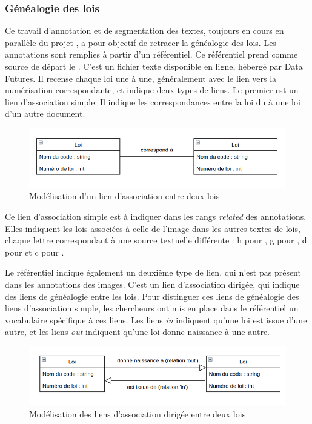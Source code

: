 \newpage
\subsubsection{Généalogie des lois}
Ce travail d'annotation et de segmentation des textes, toujours en cours en parallèle du projet \COREL, a pour objectif de retracer la généalogie des lois. Les annotations sont remplies à partir d'un référentiel. Ce référentiel prend comme source de départ le \genyuan. C'est un fichier texte disponible en ligne, hébergé par Data Futures. Il recense chaque loi une à une, généralement avec le lien vers la numérisation correspondante, et indique deux types de liens. Le premier est un lien d'association simple. Il indique les correspondances entre la loi du \genyuan à une loi d'un autre document. 
\begin{figure}[h]
    \centering
    \includegraphics[width=\textwidth]{images/image4.png}
    \caption{Modélisation d'un lien d'association entre deux lois}
    \label{Modélisation d'un lien d'association entre les lois}
\end{figure}

Ce lien d'association simple est à indiquer dans les rangs \textit{related} des annotations. Elles indiquent les lois associées à celle de l'image dans les autres textes de lois, chaque lettre correspondant à une source textuelle différente : h pour \huidian, g pour \genyuan, d pour \dc et c pour \dq. 

Le référentiel indique également un deuxième type de lien, qui n'est pas présent dans les annotations des images. C'est un lien d'association dirigée, qui indique des liens de généalogie entre les lois. Pour distinguer ces liens de généalogie des liens d'association simple, les chercheurs ont mis en place dans le référentiel un vocabulaire spécifique à ces liens. Les liens \og \textit{in} \fg indiquent qu'une loi est issue d'une autre, et les liens \og \textit{out} \fg indiquent qu'une loi donne naissance à une autre.

\begin{figure}[h]
    \centering
    \includegraphics[width=\textwidth]{images/image5.png}
    \caption{Modélisation des liens d'association dirigée entre deux lois}
\end{figure}


